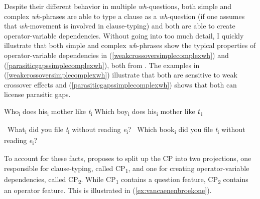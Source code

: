 Despite their different behavior in multiple \textit{wh}-questions, both simple and complex \textit{wh}-phrases are able to type a clause as a \textit{wh}-question (if one assumes that \textit{wh}-movement is involved in clause-typing) and both are able to create operator-variable dependencies. Without going into too much detail, I quickly illustrate that both simple and complex \textit{wh}-phrases show the typical properties of operator-variable dependencies in (\ref{weakcrossoversimplecomplexwh}) and (\ref{parasiticgapssimplecomplexwh}), both from \citet[240]{van2010complex}. The examples in (\ref{weakcrossoversimplecomplexwh}) illustrate that both are sensitive to weak crossover effects and (\ref{parasiticgapssimplecomplexwh}) shows that both can license parasitic gaps.

\begin{exe}
\ex\label{weakcrossoversimplecomplexwh}\begin{xlist}
\ex *Who\textsubscript{i} does his\textsubscript{i} mother like \textit{t}\textsubscript{i} \label{weakcrossoversimplecomplexwha}
\ex *Which boy\textsubscript{i} does his\textsubscript{i} mother like $\textrm{\textit{t}}$\textsubscript{i} \label{weakcrossoversimplecomplexwhb}
\end{xlist}
\end{exe}

\begin{exe}
\ex\label{parasiticgapssimplecomplexwh}\begin{xlist}
\ex \textcolor{white}{*}What\textsubscript{i} did you file \textit{t}\textsubscript{i} without reading \textit{e}\textsubscript{i}? \label{parasiticgapssimplecomplexwha}
\ex \textcolor{white}{*}Which book\textsubscript{i} did you file \textit{t}\textsubscript{i} without reading \textit{e}\textsubscript{i}? \label{parasiticgapssimplecomplexwhb}
\end{xlist}
\end{exe}

\noindent To account for these facts, \citet{van2010complex, van2012you} proposes to split up the CP into two projections, one responsible for clause-typing, called CP\textsubscript{1}, and one for creating operator-variable dependencies, called CP\textsubscript{2}. While CP\textsubscript{1} contains a question feature, CP\textsubscript{2} contains an operator feature. This is illustrated in (\ref{ex:vancaenenbroekone}).



